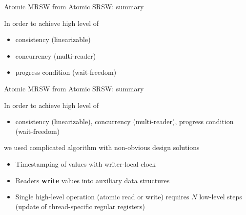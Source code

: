 \begin{frame}[t,fragile]{Atomic MRSW from Atomic SRSW: summary}

In order to achieve high level of
\begin{itemize}
  \item consistency (linearizable)
  \item concurrency (multi-reader) 
  \item progress condition (wait-freedom)
\end{itemize}

\end{frame}


\begin{frame}{Atomic MRSW from Atomic SRSW: summary}

In order to achieve high level of
\begin{itemize}
  \item consistency (linearizable), concurrency (multi-reader), progress condition (wait-freedom)
\end{itemize}

\pause
we used complicated algorithm with non-obvious design solutions
\pause
\begin{itemize}
  \item Timestamping of values with writer-local clock
  \item Readers \textbf{write} values into auxiliary data structures
  \item Single high-level operation (atomic read or write) requires $N$ low-level steps (update of thread-specific regular registers)
\end{itemize}


\end{frame}

